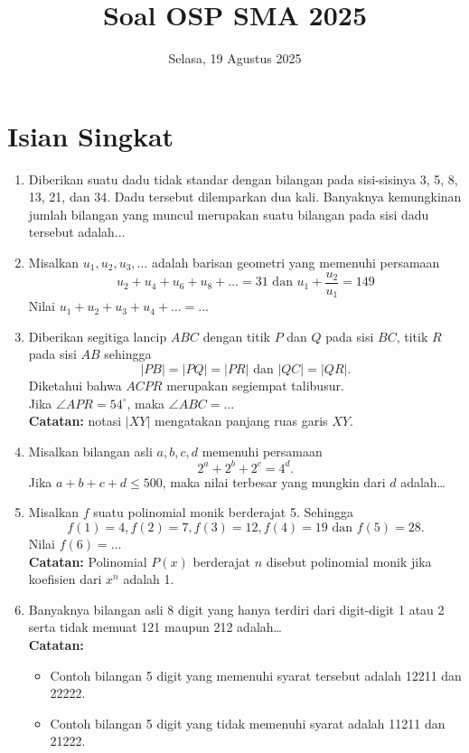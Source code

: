 \documentclass[12pt]{scrartcl}
\title{Soal OSP SMA 2025}
\date{Selasa, 19 Agustus 2025}
\begin{document}
\maketitle

\section{Isian Singkat}

\begin{enumerate}
    \item Diberikan suatu dadu tidak standar dengan bilangan pada sisi-sisinya 3, 5, 8, 13, 21, dan 34. Dadu tersebut dilemparkan dua kali. Banyaknya kemungkinan jumlah bilangan yang muncul merupakan suatu bilangan pada sisi dadu tersebut adalah...

    \item Misalkan $u_1, u_2, u_3, \dots$ adalah barisan geometri yang memenuhi persamaan 
    $$u_2 + u_4 + u_6 + u_8+\dots = 31 \text{ dan } u_1+\dfrac{u_2}{u_1} = 149$$
    Nilai $u_1 + u_2 + u_3 + u_4 + \dots = \dots$

    \item Diberikan segitiga lancip $ABC$ dengan titik $P$ dan $Q$ pada sisi $BC$, titik $R$ pada sisi $AB$ sehingga $$|PB|=|PQ|=|PR| \text{ dan } |QC|=|QR|.$$
    Diketahui bahwa $ACPR$ merupakan segiempat talibusur.\\
    Jika $\angle APR=54^\circ$, maka $\angle ABC = \dots$ \\
    \textbf{Catatan:} notasi $|XY|$ mengatakan panjang ruas garis $XY$.

    \item Misalkan bilangan asli $a, b, c, d$ memenuhi persamaan $$2^a+2^b+2^c=4^d.$$
    Jika $a+b+c+d \le 500$, maka nilai terbesar yang mungkin dari $d$ adalah\dots

    \newpage
    \item Misalkan $f$ suatu polinomial monik berderajat 5. Sehingga 
    $$f(1)=4, f(2)=7, f(3)=12, f(4)=19 \text{ dan }f(5)=28.$$
    Nilai $f(6)=\dots$ \\
    \textbf{Catatan:} Polinomial $P(x)$ berderajat $n$ disebut polinomial monik jika koefisien dari $x^n$ adalah 1.

    \item Banyaknya bilangan asli 8 digit yang hanya terdiri dari digit-digit 1 atau 2 serta tidak memuat 121 maupun 212 adalah\dots \\
    \textbf{Catatan:}
    \begin{itemize}
        \item Contoh bilangan 5 digit yang memenuhi syarat tersebut adalah 12211 dan 22222.
        \item Contoh bilangan 5 digit yang tidak memenuhi syarat adalah 11211 dan 21222.
    \end{itemize}


\end{enumerate}
\end{document}
